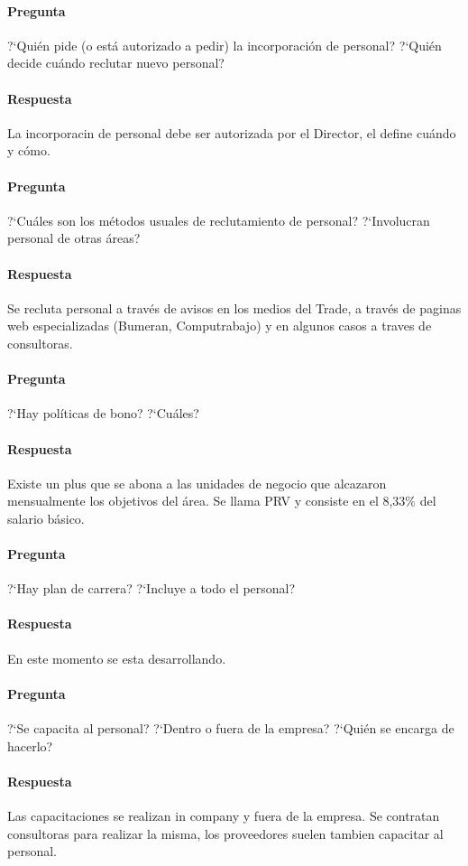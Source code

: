 \documentclass[12pt,a4paper,spanish]{article}
\begin{document}
	\paragraph{Pregunta}
	 ?`Qui\'en pide (o est\'a autorizado a pedir) la incorporaci\'on de personal?  ?`Qui\'en decide cu\'ando reclutar nuevo personal?
	\paragraph{Respuesta}
	La incorporacin de personal debe ser autorizada por el Director, el define cu\'ando y c\'omo.
	
	\paragraph{Pregunta}
	 ?`Cu\'ales son los m\'etodos usuales de reclutamiento de personal?  ?`Involucran personal de otras \'areas?
	\paragraph{Respuesta}
	Se recluta personal a trav\'es de avisos en los medios del Trade, a trav\'es de paginas web especializadas (Bumeran, Computrabajo) y en algunos casos a traves de consultoras.
	
	\paragraph{Pregunta}
	 ?`Hay pol\'iticas de bono?  ?`Cu\'ales?
	\paragraph{Respuesta}
	Existe un plus que se abona a las unidades de negocio que alcazaron mensualmente los objetivos del \'area. Se llama PRV y consiste en el 8,33\% del salario b\'asico.
	
	\paragraph{Pregunta}
	 ?`Hay plan de carrera?  ?`Incluye a todo el personal?
	\paragraph{Respuesta}
	En este momento se esta desarrollando.
	
	\paragraph{Pregunta}
	 ?`Se capacita al personal?  ?`Dentro o fuera de la empresa?  ?`Qui\'en se encarga de hacerlo?
	\paragraph{Respuesta}
	Las capacitaciones se realizan in company y fuera de la empresa. Se contratan consultoras para realizar la misma, los proveedores suelen tambien capacitar al personal. 
\end{document}
